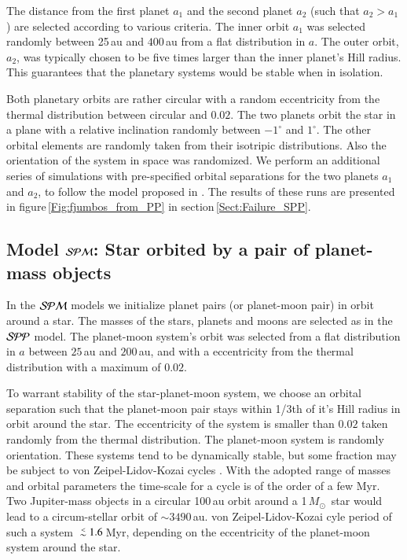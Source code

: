 \documentclass[submission,phys]{lib/SciPost}
\newcommand{\MSun}{\mbox{${M}_\odot$}}
\def\aplt{\ {\raise-.5ex\hbox{$\buildrel<\over\sim$}}\ }
\begin{document}
The distance from the first
planet $a_1$ and the second planet $a_2$ (such that $a_2>a_1$) are
selected according to various criteria.  The inner orbit $a_1$ was
selected randomly between 25\,au and $400$\,au from a flat
distribution in $a$.  The outer orbit, $a_2$, was typically chosen to
be five times larger than the inner planet's Hill radius.  This
guarantees that the planetary systems would be stable when in
isolation.

Both planetary orbits are rather circular with a random eccentricity
from the thermal distribution between circular and $0.02$.  The two
planets orbit the star in a plane with a relative inclination randomly
between $-1^\circ$ and $1^\circ$. The other orbital elements are
randomly taken from their isotripic distributions.  Also the
orientation of the system in space was randomized.  We perform an
additional series of simulations with pre-specified orbital
separations for the two planets $a_1$ and $a_2$, to follow the model
proposed in \cite{2023arXiv231006016W}. The results of these runs are
presented in figure\,\ref{Fig:fjumbos_from_PP} in
section\,\ref{Sect:Failure_SPP}.

\subsection{Model ${\cal SPM}$: Star orbited by a pair of planet-mass objects}

In the ${\cal SPM}$ models we initialize planet pairs (or planet-moon
pair) in orbit around a star. The masses of the stars, planets and
moons are selected as in the ${\cal SPP}$ model.  The planet-moon
system's orbit was selected from a flat distribution in $a$ between
$25$\,au and $200$\,au, and with a eccentricity from the thermal
distribution with a maximum of $0.02$.

To warrant stability of the star-planet-moon system, we choose an
orbital separation such that the planet-moon pair stays within 1/3th
of it's Hill radius in orbit around the star. The eccentricity of the
system is smaller than $0.02$ taken randomly from the thermal
distribution.  The planet-moon system is randomly orientation.  These
systems tend to be dynamically stable, but some fraction may be
subject to von Zeipel-Lidov-Kozai cycles
\cite{1910AN....183..345V,1962PSS..9..719L,1962AJ.....67..591K}.  With
the adopted range of masses and orbital parameters the time-scale for
a cycle is of the order of a few Myr.  Two Jupiter-mass objects in a
circular 100\,au orbit around a 1\,\MSun\, star would lead to a
circum-stellar orbit of $\sim 3490$\,au. von Zeipel-Lidov-Kozai cyle
period of such a system $\aplt 1.6$\,Myr, depending on the
eccentricity of the planet-moon system around the star.
\end{document}
